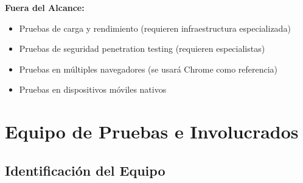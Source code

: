 \documentclass[12pt,a4paper]{article}
\begin{document}
\textbf{Fuera del Alcance:}
\begin{itemize}
    \item Pruebas de carga y rendimiento (requieren infraestructura especializada)
    \item Pruebas de seguridad penetration testing (requieren especialistas)
    \item Pruebas en múltiples navegadores (se usará Chrome como referencia)
    \item Pruebas en dispositivos móviles nativos
\end{itemize}

\section{Equipo de Pruebas e Involucrados}

\subsection{Identificación del Equipo}
\end{document}
